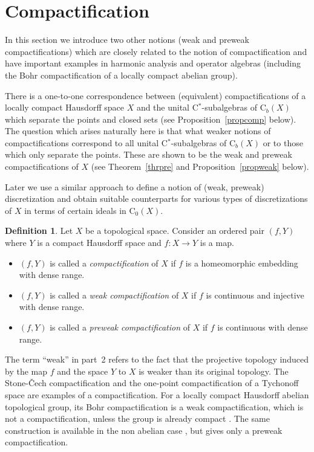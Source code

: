 \documentclass[manuscript]{amsart}
\theoremstyle{definition}
\newtheorem{definition}{Definition}[section]
\begin{document}
\section{Compactification}
\noindent
In this section we  introduce two other notions (weak  and preweak compactifications)
which are closely related to the notion of compactification and
 have important examples in harmonic analysis and
operator algebras (including the Bohr compactification of a locally compact abelian group).

There is a one-to-one correspondence between (equivalent) compactifications
of a locally compact Hausdorff space $X$ and the unital C$^*$-subalgebras of
$\mathrm{C}_{b}(X)$ which separate the
points and closed sets (see Proposition~\ref{propcomp} below).
The question which arises naturally here is that
what   weaker notions of compactifications
 correspond to all  unital C$^*$-subalgebras of
$\mathrm{C}_{b}(X)$ or to those which only separate the
points.
These are shown to be the weak  and
preweak compactifications of $X$
(see Theorem~\ref{thrpre} and Proposition~\ref{propweak} below).

Later we use a similar
approach to define
a  notion of (weak, preweak) discretization
and obtain suitable counterparts
for   various types of discretizations of $X$
 in terms of
certain ideals in $\mathrm{C}_{0}(X)$.
\begin{definition}\label{defcomp}
Let $X$ be a topological space. Consider an ordered pair
$(f,Y)$ where $Y$ is a compact Hausdorff space and $f: X\to Y$ is a map.
\begin{itemize}
\item[(1)] $(f,Y)$ is called a \emph{compactification} of $X$ if $f$ is a homeomorphic
embedding  with dense range.
\item[(2)] $(f,Y)$ is called a \emph{weak compactification} of $X$ if $f$ is  continuous and injective with dense range.
\item[(3)] $(f,Y)$ is called a \emph{preweak compactification} of $X$ if $f$ is continuous  with dense range.
\end{itemize}
\end{definition}
The term ``weak'' in part~2 refers to the fact that the projective topology
induced by the map $f$ and the space $Y$ to $X$ is weaker than its original topology.
The Stone-\v{C}ech compactification and the one-point compactification of a Tychonoff space
are examples of a compactification. For a locally compact Hausdorff abelian topological group, its Bohr compactification is a weak compactification, which is 
not a compactification, unless the group is already compact \cite[Section~4.7]{fo95}. The same construction is available in the non abelian case \cite{ho64}, but gives only a preweak compactification.
\end{document}
